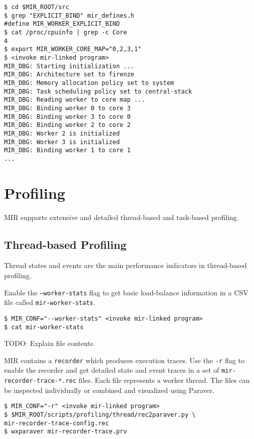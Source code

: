 \documentclass[11pt,a4paper]{article}
\begin{document}
\begin{lstlisting}[style=MyInputStyle]
$ cd $MIR_ROOT/src
$ grep "EXPLICIT_BIND" mir_defines.h
#define MIR_WORKER_EXPLICIT_BIND
$ cat /proc/cpuinfo | grep -c Core
4
$ export MIR_WORKER_CORE_MAP="0,2,3,1"
$ <invoke mir-linked program>
MIR_DBG: Starting initialization ...
MIR_DBG: Architecture set to firenze
MIR_DBG: Memory allocation policy set to system
MIR_DBG: Task scheduling policy set to central-stack
MIR_DBG: Reading worker to core map ...
MIR_DBG: Binding worker 0 to core 3
MIR_DBG: Binding worker 3 to core 0
MIR_DBG: Binding worker 2 to core 2
MIR_DBG: Worker 2 is initialized
MIR_DBG: Worker 3 is initialized
MIR_DBG: Binding worker 1 to core 1
...
\end{lstlisting}

\section{Profiling}\label{profiling}

MIR supports extensive and detailed thread-based and task-based profiling.

\subsection{Thread-based Profiling}\label{thread-based-profiling}

Thread states and events are the main performance indicators in thread-based profiling.

Enable the \texttt{--worker-stats} flag to get basic load-balance information in a CSV file called \texttt{mir-worker-stats}.

\begin{lstlisting}[style=MyInputStyle]
$ MIR_CONF="--worker-stats" <invoke mir-linked program>
$ cat mir-worker-stats
\end{lstlisting}

TODO: Explain file contents.

MIR contains a \texttt{recorder} which produces execution traces. Use the \texttt{-r} flag to enable the recorder and get detailed state and event traces in a set of \texttt{mir-recorder-trace-*.rec} files.  Each file represents a worker thread. The files can be inspected individually or combined and visualized using Paraver.

\begin{lstlisting}[style=MyInputStyle]
$ MIR_CONF="-r" <invoke mir-linked program>
$ $MIR_ROOT/scripts/profiling/thread/rec2paraver.py \
mir-recorder-trace-config.rec
$ wxparaver mir-recorder-trace.prv
\end{lstlisting}
\end{document}
